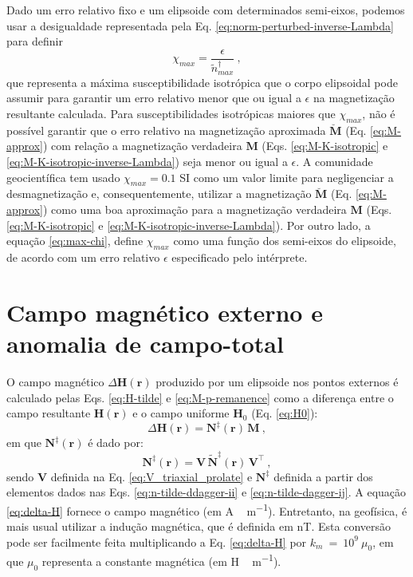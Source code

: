 Dado um erro relativo fixo
e um elipsoide com determinados semi-eixos, podemos usar a desigualdade representada pela 
Eq. \ref{eq:norm-perturbed-inverse-Lambda}
para definir
\begin{equation}
\chi_{max} = \frac{\epsilon}{\tilde{n}^{\dagger}_{max}} \: ,
\label{eq:max-chi}
\end{equation}
que representa a máxima susceptibilidade isotrópica que o corpo elipsoidal
pode assumir para garantir um erro relativo menor que ou igual a $\epsilon$ na magnetização resultante calculada.
Para susceptibilidades isotrópicas maiores que $\chi_{max}$,
não é possível garantir que o erro relativo na magnetização aproximada
$\breve{\mathbf{M}}$ (Eq. \ref{eq:M-approx}) com relação a magnetização verdadeira
$\mathbf{M}$ (Eqs. \ref{eq:M-K-isotropic} e \ref{eq:M-K-isotropic-inverse-Lambda})
seja menor ou igual a $\epsilon$. A comunidade geocientífica tem usado $\chi_{max} = 0.1$ SI
como um valor limite para negligenciar a desmagnetização e, consequentemente, utilizar a magnetização
$\breve{\mathbf{M}}$ (Eq. \ref{eq:M-approx}) como uma boa aproximação para a magnetização
verdadeira $\mathbf{M}$ (Eqs. \ref{eq:M-K-isotropic} e \ref{eq:M-K-isotropic-inverse-Lambda}).
Por outro lado, a equação \ref{eq:max-chi}, define $\chi_{max}$ como uma função dos semi-eixos do elipsoide,
de acordo com um erro relativo $\epsilon$ especificado pelo intérprete.

\section{Campo magnético externo e anomalia de campo-total}

O campo magnético $\Delta {\mathbf{H}}({\mathbf{r}})$ produzido por um elipsoide nos pontos externos é calculado pelas Eqs. \ref{eq:H-tilde} e \ref{eq:M-p-remanence} como a diferença entre o campo resultante ${\mathbf{H}}({\mathbf{r}})$ 
e o campo uniforme ${\mathbf{H}}_{0}$ (Eq. \ref{eq:H0}):
\begin{equation}
\Delta {\mathbf{H}}({\mathbf{r}}) = 
{\mathbf{N}}^{\ddagger}({\mathbf{r}}) \, {\mathbf{M}} \: ,
\label{eq:delta-H}
\end{equation}
em que ${\mathbf{N}}^{\ddagger}({\mathbf{r}})$ é dado por:
\begin{equation}
{\mathbf{N}}^{\ddagger}({\mathbf{r}}) = 
\mathbf{V} \, \tilde{{\mathbf{N}}}^{\ddagger}({\mathbf{r}}) \, \mathbf{V}^{\top}
\label{eq:n-p} \: ,
\end{equation}
sendo $\mathbf{V}$ definida na Eq. \ref{eq:V_triaxial_prolate} e $\mathbf{N^{\ddagger}}$ definida a partir dos elementos dados nas Eqs. \ref{eq:n-tilde-ddagger-ii} e \ref{eq:n-tilde-dagger-ij}. A equação \ref{eq:delta-H} fornece o campo magnético (em \unit{A \, m^{-1}}). Entretanto, na geofísica, é mais usual utilizar a indução magnética, que é definida em \unit{nT}. Esta conversão pode ser facilmente feita multiplicando a Eq. \ref{eq:delta-H} por $k_{m}~=~10^{9}~\mu_{0}$, em que $\mu_{0}$ representa a constante magnética (em \unit{H \, m^{-1}}).

